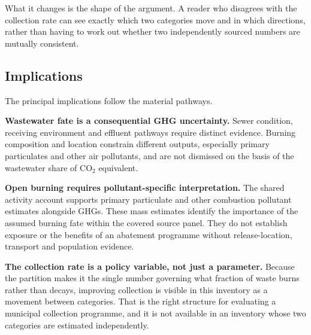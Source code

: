 What it changes is the shape of the argument. A reader who disagrees with the collection rate
can see exactly which two categories move and in which directions, rather than having to work
out whether two independently sourced numbers are mutually consistent.

\subsection{Implications}

The principal implications follow the material pathways.

\textbf{Wastewater fate is a consequential GHG uncertainty.} Sewer condition, receiving environment and effluent pathways require distinct evidence. Burning composition and location constrain different outputs, especially primary particulates and other air pollutants, and are not dismissed on the basis of the wastewater share of CO$_2$ equivalent.

\textbf{Open burning requires pollutant-specific interpretation.} The shared activity account supports primary particulate and other combustion pollutant estimates alongside GHGs. These mass estimates identify the importance of the assumed burning fate within the covered source panel. They do not establish exposure or the benefits of an abatement programme without release-location, transport and population evidence.

\textbf{The collection rate is a policy variable, not just a parameter.} Because the partition
makes it the single number governing what fraction of waste burns rather than decays,
improving collection is visible in this inventory as a movement between categories. That is
the right structure for evaluating a municipal collection programme, and it is not available
in an inventory whose two categories are estimated independently.
